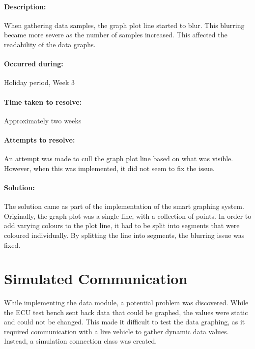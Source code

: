 {{{			\paragraph{Description:}
			When gathering data samples, the graph plot line started to blur. This blurring became more severe as the number of samples increased. This affected the readability of the data graphs.
			\paragraph{Occurred during:}
			Holiday period, Week 3
			\paragraph{Time taken to resolve:}
			Approximately two weeks
			\paragraph{Attempts to resolve:}
			An attempt was made to cull the graph plot line based on what was visible. However, when this was implemented, it did not seem to fix the issue. 
			\paragraph{Solution:}
			The solution came as part of the implementation of the smart graphing system. Originally, the graph plot was a single line, with a collection of points. In order to add varying colours to the plot line, it had to be split into segments that were coloured individually. By splitting the line into segments, the blurring issue was fixed.
		}
	}
	\label{ssec:DataModuleIssues}

\section{Simulated Communication}{
		\paragraph{}{
		While implementing the data module, a potential problem was discovered. While the ECU test bench sent back data that could be graphed, the values were static and could not be changed. This made it difficult to test the data graphing, as it required communication with a live vehicle to gather dynamic data values. Instead, a simulation connection class was created.
		}
}}
